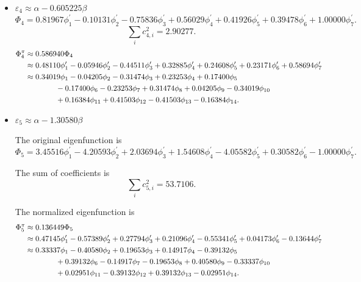 \documentclass[a4paper]{book}
\begin{document}
\begin{solution}
\begin{enumerate}[label=(\alph*)]
\begin{itemize}
		
		\item $\varepsilon_4 \approx \alpha - 0.605225 \beta$
		\begin{equation*}
			\Phi_4 = 0.81967 \phi^\prime_1 -0.10131 \phi^\prime_2 -0.75836 \phi^\prime_3 + 0.56029 \phi^\prime_4 + 0.41926 \phi^\prime_5 + 0.39478 \phi^\prime_6 + 1.00000 \phi^\prime_7.
		\end{equation*}
		\begin{equation*}
			\sum_{i} c^2_{4,i} = 2.90277.
		\end{equation*}
		\begin{align}
			\Phi^\pi_4 &\approx 0.586940 \Phi_4 \notag \\
			&\approx 0.48110 \phi^\prime_1 - 0.05946 \phi^\prime_2 -0.44511 \phi^\prime_3 +0.32885 \phi^\prime_4 + 0.24608 \phi^\prime_5 + 0.23171 \phi^\prime_6 + 0.58694 \phi^\prime_7 \notag \\
			&\approx 0.34019 \phi_1 -0.04205 \phi_2 -0.31474 \phi_3 + 0.23253 \phi_4 + 0.17400 \phi_5  \notag \\
			&\hspace*{4em} -0.17400 \phi_6 -0.23253 \phi_7 +0.31474 \phi_8 +0.04205 \phi_9 -0.34019 \phi_{10} \notag \\
			&\hspace*{4em} +0.16384 \phi_{11} + 0.41503 \phi_{12} -0.41503 \phi_{13} -0.16384\phi_{14} .
		\end{align}
		
		
		\item $\varepsilon_5 \approx \alpha -1.30580 \beta$
		
		The original eigenfunction is
		\begin{equation*}
			\Phi_5 = 3.45516 \phi^\prime_1 - 4.20593 \phi^\prime_2 + 2.03694 \phi^\prime_3 + 1.54608 \phi^\prime_4 - 4.05582 \phi^\prime_5 + 0.30582 \phi^\prime_6 - 1.00000 \phi^\prime_7.
		\end{equation*}
		
		The sum of coefficients is
		\begin{equation*}
			\sum_{i} c^2_{5,i} = 53.7106.
		\end{equation*}
		
		The normalized eigenfunction is
		\begin{align}
			\Phi^\pi_5 &\approx 0.136449 \Phi_5 \notag \\
			&\approx 0.47145 \phi^\prime_1 -0.57389 \phi^\prime_2 +0.27794 \phi^\prime_3 + 0.21096 \phi^\prime_4 - 0.55341 \phi^\prime_5 + 0.04173 \phi^\prime_6 - 0.13644 \phi^\prime_7\\
			&\approx 0.33337 \phi_1 -0.40580 \phi_2 +0.19653 \phi_3 + 0.14917 \phi_4 - 0.39132 \phi_5  \notag \\
			&\hspace*{4em} +0.39132 \phi_6 -0.14917 \phi_7 -0.19653 \phi_8 +0.40580 \phi_9 -0.33337 \phi_{10} \notag \\
			&\hspace*{4em} + 0.02951 \phi_{11} - 0.39132 \phi_{12} + 0.39132 \phi_{13} - 0.02951 \phi_{14} .
		\end{align}
		

\end{itemize}
\end{enumerate}
\end{solution}
\end{document}
